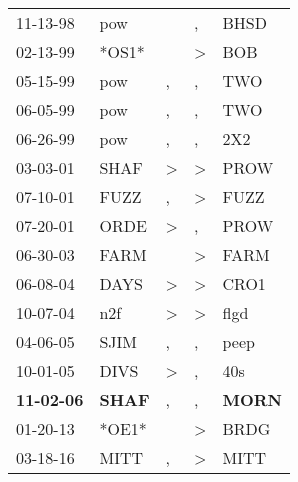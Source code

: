 \begin{supertabular}{p{0.07\textwidth}p{0.06\textwidth}p{0.02\textwidth}p{0.02\textwidth}p{0.06\textwidth}}
          11-13-98\textsuperscript{} &            pow\textsuperscript{} &               &             , &           BHSD\textsuperscript{} \\
          02-13-99\textsuperscript{} &                            *OS1* &               &  \textgreater &            BOB\textsuperscript{} \\
          05-15-99\textsuperscript{} &            pow\textsuperscript{} &             , &             , &            TWO\textsuperscript{} \\
          06-05-99\textsuperscript{} &            pow\textsuperscript{} &             , &             , &            TWO\textsuperscript{} \\
          06-26-99\textsuperscript{} &            pow\textsuperscript{} &             , &             , &            2X2\textsuperscript{} \\
          03-03-01\textsuperscript{} &           SHAF\textsuperscript{} &  \textgreater &  \textgreater &           PROW\textsuperscript{} \\
          07-10-01\textsuperscript{} &           FUZZ\textsuperscript{} &             , &  \textgreater &           FUZZ\textsuperscript{} \\
          07-20-01\textsuperscript{} &           ORDE\textsuperscript{} &  \textgreater &             , &           PROW\textsuperscript{} \\
          06-30-03\textsuperscript{} &           FARM\textsuperscript{} &               &  \textgreater &           FARM\textsuperscript{} \\
          06-08-04\textsuperscript{} &           DAYS\textsuperscript{} &  \textgreater &  \textgreater &           CRO1\textsuperscript{} \\
          10-07-04\textsuperscript{} &            n2f\textsuperscript{} &  \textgreater &  \textgreater &           flgd\textsuperscript{} \\
          04-06-05\textsuperscript{} &           SJIM\textsuperscript{} &             , &             , &           peep\textsuperscript{} \\
          10-01-05\textsuperscript{} &           DIVS\textsuperscript{} &  \textgreater &             , &            40s\textsuperscript{} \\
 \textbf{11-02-06\textsuperscript{}} &  \textbf{SHAF\textsuperscript{}} &             , &             , &  \textbf{MORN\textsuperscript{}} \\
          01-20-13\textsuperscript{} &                            *OE1* &               &  \textgreater &           BRDG\textsuperscript{} \\
          03-18-16\textsuperscript{} &           MITT\textsuperscript{} &             , &  \textgreater &           MITT\textsuperscript{} \\
\end{supertabular}
